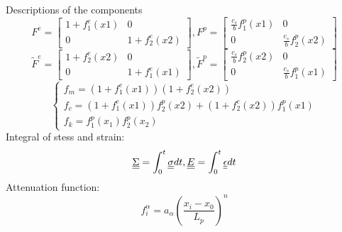 \begin{frame}{Descriptions of the components}
\begin{equation*}
F^e = \begin{bmatrix}
1+f^e_1(x1)&0\\0&1+f^e_2(x2)
\end{bmatrix}, F^p = \begin{bmatrix}
\frac{c_s}{b}f^p_1(x1)&0\\0&\frac{c_s}{b}f^p_2(x2) 
\end{bmatrix} 
\end{equation*}
\begin{equation*}
\tilde{F}^e = \begin{bmatrix}
1+f^e_2(x2)&0\\0&1+f^e_1(x1)
\end{bmatrix}, \tilde{F}^p = \begin{bmatrix}
\frac{c_s}{b}f^p_2(x2)&0\\0&\frac{c_s}{b}f^p_1(x1) 
\end{bmatrix} 
\end{equation*}
\begin{equation*}
\begin{cases}
f_m = (1+f^e_1(x1))(1+f^e_2(x2))\\
f_c = (1+f^e_1(x1))f^p_2(x2) + (1+f^e_2(x2))f^p_1(x1)\\
f_k = f^p_1(x_1)f^p_2(x_2)
\end{cases}
\end{equation*}
Integral of stess and strain:
\begin{equation*}
\underline{\underline{\Sigma}} = \int^t_0 \underline{\underline{\sigma}} dt, \underline{\underline{E}} = \int^t_0 \underline{\underline{\epsilon}} dt
\end{equation*}
Attenuation function:
\begin{equation*}
f^\alpha_i = a_\alpha\left(\frac{x_i - x_0}{L_p} \right)^n
\end{equation*}
\end{frame}

